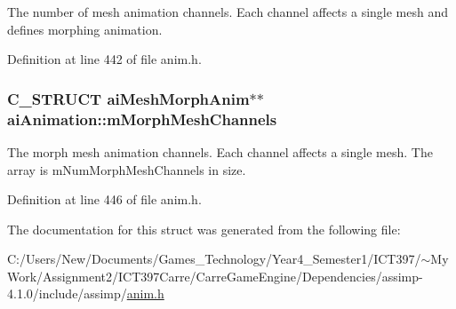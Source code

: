 The number of mesh animation channels. Each channel affects a single mesh and defines morphing animation. 

Definition at line 442 of file anim.h.\hypertarget{structai_animation_bcc055a00bed8ce3329fdf4a9c22ec9c}{
\subsubsection[mMorphMeshChannels]{\setlength{\rightskip}{0pt plus 5cm}C\_\-STRUCT {\bf aiMeshMorphAnim}$\ast$$\ast$ {\bf aiAnimation::mMorphMeshChannels}}}
\label{structai_animation_bcc055a00bed8ce3329fdf4a9c22ec9c}


The morph mesh animation channels. Each channel affects a single mesh. The array is mNumMorphMeshChannels in size. 

Definition at line 446 of file anim.h.

The documentation for this struct was generated from the following file:\begin{CompactItemize}
\item 
C:/Users/New/Documents/Games\_\-Technology/Year4\_\-Semester1/ICT397/$\sim$My Work/Assignment2/ICT397Carre/CarreGameEngine/Dependencies/assimp-4.1.0/include/assimp/\hyperlink{anim_8h}{anim.h}\end{CompactItemize}
